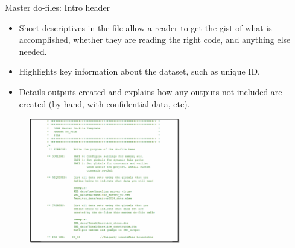 \documentclass[aspectratio=169]{beamer}
\begin{document}
\begin{frame}[fragile]{Master do-files: Intro header}
\begin{multicols}{2}	
	
	\begin{itemize}[<default overlay specification>]
		\item<1> Short descriptives in the file allow a reader to get the gist of what is accomplished, whether they are reading the right code, and anything else needed.
		\item<1> Highlights key information about the dataset, such as unique ID.
		\item<1> Details outputs created and explains how any outputs not included are created (by hand, with confidential data, etc).
	\end{itemize}
	
	\begin{figure}
		\centering
		\includegraphics[height=55mm]{img/Structure13}
	\end{figure}
	
\end{multicols}
\end{frame}
\end{document}
